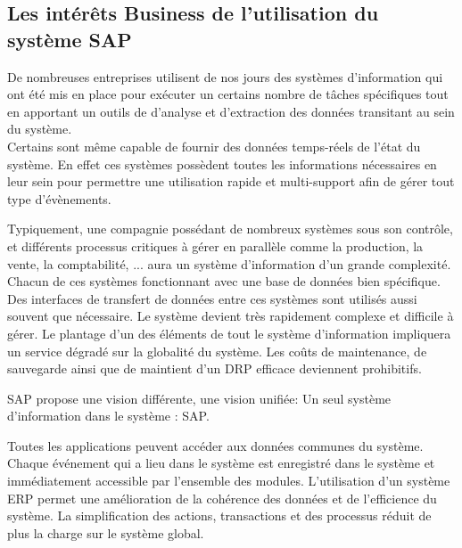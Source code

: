 \clearpage

\subsection{Les intérêts Business de l'utilisation du système SAP}

De nombreuses entreprises utilisent de nos jours des systèmes d'information qui ont été mis en place pour exécuter un certains nombre de tâches spécifiques tout en apportant un outils de d'analyse et d'extraction des données transitant au sein du système.\\
Certains sont même capable de fournir des données temps-réels de l'état du système. En effet ces systèmes possèdent toutes les informations nécessaires en leur sein pour permettre une utilisation rapide et multi-support afin de gérer tout type d'évènements. 

Typiquement, une compagnie possédant de nombreux systèmes sous son contrôle, et différents processus critiques à gérer en parallèle comme la production, la vente, la comptabilité, ... aura un système d'information d'un grande complexité.  Chacun de ces systèmes fonctionnant avec une base de données bien spécifique. \\
Des interfaces de transfert de données entre ces systèmes sont utilisés aussi souvent que nécessaire. Le système devient très rapidement complexe et difficile à gérer. Le plantage d'un des éléments de tout le système d'information impliquera un service dégradé sur la globalité du système. Les coûts de maintenance, de sauvegarde ainsi que de maintient d'un DRP efficace deviennent prohibitifs.

SAP propose une vision différente, une vision unifiée: Un seul système d'information dans le système : SAP. 

Toutes les applications peuvent accéder aux données communes du système. Chaque événement qui a lieu dans le système est enregistré dans le système et immédiatement accessible par l'ensemble des modules. L'utilisation d'un système ERP permet une amélioration de la cohérence des données et de l'efficience du système. La simplification des actions, transactions et des processus réduit de plus la charge sur le système global. 

\clearpage
